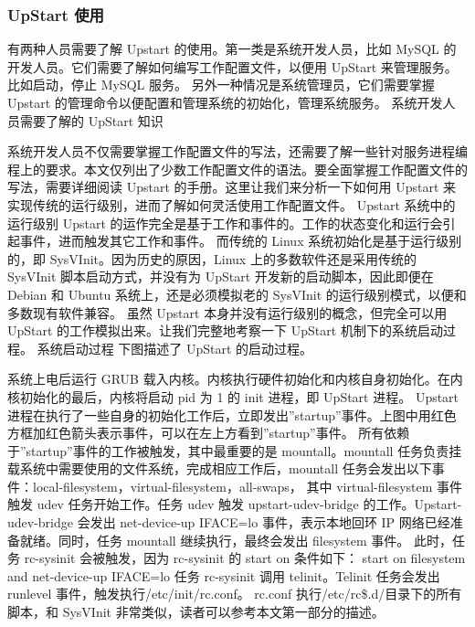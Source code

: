 \documentclass[a4paper,10pt,english]{sphinxmanual}
\begin{document}
\subsubsection{UpStart 使用}
\label{\detokenize{linux/point:id3}}
有两种人员需要了解 Upstart 的使用。第一类是系统开发人员，比如 MySQL 的开发人员。它们需要了解如何编写工作配置文件，以便用 UpStart 来管理服务。比如启动，停止 MySQL 服务。
另外一种情况是系统管理员，它们需要掌握 Upstart 的管理命令以便配置和管理系统的初始化，管理系统服务。
系统开发人员需要了解的 UpStart 知识

系统开发人员不仅需要掌握工作配置文件的写法，还需要了解一些针对服务进程编程上的要求。本文仅列出了少数工作配置文件的语法。要全面掌握工作配置文件的写法，需要详细阅读 Upstart 的手册。这里让我们来分析一下如何用 Upstart 来实现传统的运行级别，进而了解如何灵活使用工作配置文件。
Upstart 系统中的运行级别
Upstart 的运作完全是基于工作和事件的。工作的状态变化和运行会引起事件，进而触发其它工作和事件。
而传统的 Linux 系统初始化是基于运行级别的，即 SysVInit。因为历史的原因，Linux 上的多数软件还是采用传统的 SysVInit 脚本启动方式，并没有为 UpStart 开发新的启动脚本，因此即便在 Debian 和 Ubuntu 系统上，还是必须模拟老的 SysVInit 的运行级别模式，以便和多数现有软件兼容。
虽然 Upstart 本身并没有运行级别的概念，但完全可以用 UpStart 的工作模拟出来。让我们完整地考察一下 UpStart 机制下的系统启动过程。
系统启动过程
下图描述了 UpStart 的启动过程。

系统上电后运行 GRUB 载入内核。内核执行硬件初始化和内核自身初始化。在内核初始化的最后，内核将启动 pid 为 1 的 init 进程，即 UpStart 进程。
Upstart 进程在执行了一些自身的初始化工作后，立即发出”startup”事件。上图中用红色方框加红色箭头表示事件，可以在左上方看到”startup”事件。
所有依赖于”startup”事件的工作被触发，其中最重要的是 mountall。mountall 任务负责挂载系统中需要使用的文件系统，完成相应工作后，mountall 任务会发出以下事件：local-filesystem，virtual-filesystem，all-swaps，
其中 virtual-filesystem 事件触发 udev 任务开始工作。任务 udev 触发 upstart-udev-bridge 的工作。Upstart-udev-bridge 会发出 net-device-up IFACE=lo 事件，表示本地回环 IP 网络已经准备就绪。同时，任务 mountall 继续执行，最终会发出 filesystem 事件。
此时，任务 rc-sysinit 会被触发，因为 rc-sysinit 的 start on 条件如下：
start on filesystem and net-device-up IFACE=lo
任务 rc-sysinit 调用 telinit。Telinit 任务会发出 runlevel 事件，触发执行/etc/init/rc.conf。
rc.conf 执行/etc/rc\$.d/目录下的所有脚本，和 SysVInit 非常类似，读者可以参考本文第一部分的描述。
\end{document}
